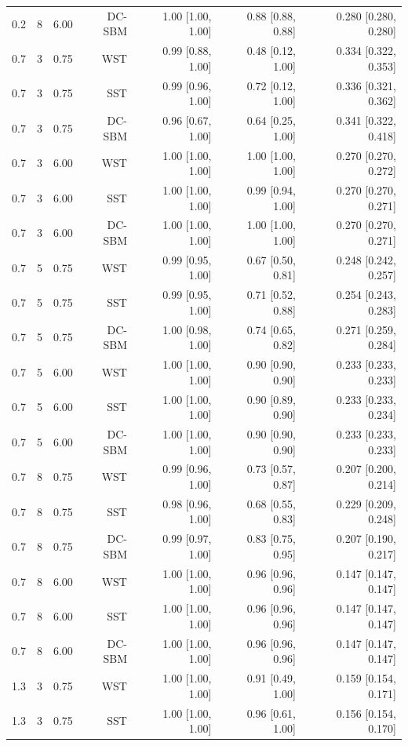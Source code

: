 \begin{table}[!h]
\begin{tabular}[t]{rrrrrrr}
0.2 & 8 & 6.00 & DC-SBM & 1.00 [1.00, 1.00] & 0.88 [0.88, 0.88] & 0.280 [0.280, 0.280]\\
0.7 & 3 & 0.75 & WST & 0.99 [0.88, 1.00] & 0.48 [0.12, 1.00] & 0.334 [0.322, 0.353]\\
0.7 & 3 & 0.75 & SST & 0.99 [0.96, 1.00] & 0.72 [0.12, 1.00] & 0.336 [0.321, 0.362]\\
0.7 & 3 & 0.75 & DC-SBM & 0.96 [0.67, 1.00] & 0.64 [0.25, 1.00] & 0.341 [0.322, 0.418]\\
0.7 & 3 & 6.00 & WST & 1.00 [1.00, 1.00] & 1.00 [1.00, 1.00] & 0.270 [0.270, 0.272]\\
0.7 & 3 & 6.00 & SST & 1.00 [1.00, 1.00] & 0.99 [0.94, 1.00] & 0.270 [0.270, 0.271]\\
0.7 & 3 & 6.00 & DC-SBM & 1.00 [1.00, 1.00] & 1.00 [1.00, 1.00] & 0.270 [0.270, 0.271]\\
0.7 & 5 & 0.75 & WST & 0.99 [0.95, 1.00] & 0.67 [0.50, 0.81] & 0.248 [0.242, 0.257]\\
0.7 & 5 & 0.75 & SST & 0.99 [0.95, 1.00] & 0.71 [0.52, 0.88] & 0.254 [0.243, 0.283]\\
0.7 & 5 & 0.75 & DC-SBM & 1.00 [0.98, 1.00] & 0.74 [0.65, 0.82] & 0.271 [0.259, 0.284]\\
0.7 & 5 & 6.00 & WST & 1.00 [1.00, 1.00] & 0.90 [0.90, 0.90] & 0.233 [0.233, 0.233]\\
0.7 & 5 & 6.00 & SST & 1.00 [1.00, 1.00] & 0.90 [0.89, 0.90] & 0.233 [0.233, 0.234]\\
0.7 & 5 & 6.00 & DC-SBM & 1.00 [1.00, 1.00] & 0.90 [0.90, 0.90] & 0.233 [0.233, 0.233]\\
0.7 & 8 & 0.75 & WST & 0.99 [0.96, 1.00] & 0.73 [0.57, 0.87] & 0.207 [0.200, 0.214]\\
0.7 & 8 & 0.75 & SST & 0.98 [0.96, 1.00] & 0.68 [0.55, 0.83] & 0.229 [0.209, 0.248]\\
0.7 & 8 & 0.75 & DC-SBM & 0.99 [0.97, 1.00] & 0.83 [0.75, 0.95] & 0.207 [0.190, 0.217]\\
0.7 & 8 & 6.00 & WST & 1.00 [1.00, 1.00] & 0.96 [0.96, 0.96] & 0.147 [0.147, 0.147]\\
0.7 & 8 & 6.00 & SST & 1.00 [1.00, 1.00] & 0.96 [0.96, 0.96] & 0.147 [0.147, 0.147]\\
0.7 & 8 & 6.00 & DC-SBM & 1.00 [1.00, 1.00] & 0.96 [0.96, 0.96] & 0.147 [0.147, 0.147]\\
1.3 & 3 & 0.75 & WST & 1.00 [1.00, 1.00] & 0.91 [0.49, 1.00] & 0.159 [0.154, 0.171]\\
1.3 & 3 & 0.75 & SST & 1.00 [1.00, 1.00] & 0.96 [0.61, 1.00] & 0.156 [0.154, 0.170]\\

\end{tabular}
\end{table}
